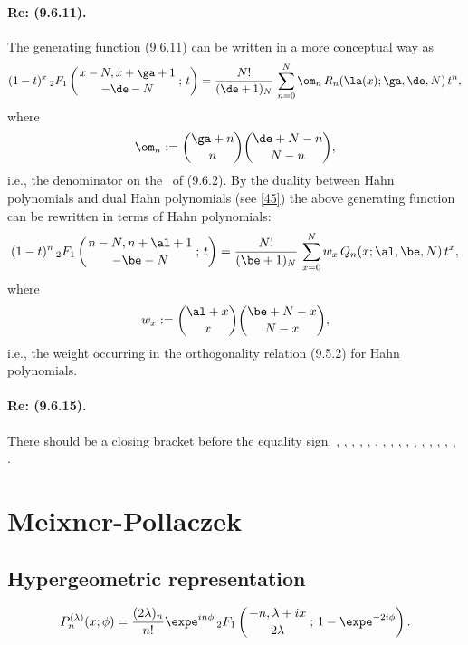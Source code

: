 \documentclass[envcountchap,graybox]{svmono}
\newcommand{\hyp}[5]{\mbox{}_{#1}{F}_{#2}
\left(\genfrac{}{}{0pt}{}{#3}{#4}\,;\,#5\right)}
\begin{document}
\paragraph{Re: (9.6.11).}
The generating function (9.6.11) can be written in a more conceptual way as
\begin{equation}
(1-t)^x\,\hyp21{x-N,x+\ga+1}{-\de-N}t=\frac{N!}{(\de+1)_N}\,
\sum_{n=0}^N \om_n\,R_n(\la(x);\ga,\de,N)\,t^n,
\label{2}
\end{equation}
where
\begin{equation}
\om_n:=\binom{\ga+n}n \binom{\de+N-n}{N-n},
\label{3}
\end{equation}
i.e., the denominator on the \RHS\ of (9.6.2).
By the duality between Hahn polynomials and dual Hahn polynomials (see \eqref{45}) the above generating function can be rewritten in
terms of Hahn polynomials:
\begin{equation}
(1-t)^n\,\hyp21{n-N,n+\al+1}{-\be-N}t=\frac{N!}{(\be+1)_N}\,
\sum_{x=0}^N w_x\,Q_n(x;\al,\be,N)\,t^x,
\label{4}
\end{equation}
where
\begin{equation}
w_x:=\binom{\al+x}x \binom{\be+N-x}{N-x},
\label{5}
\end{equation}
i.e., the weight occurring in the orthogonality relation (9.5.2)
for Hahn polynomials.
\paragraph{Re: (9.6.15).}
There should be a closing bracket before the equality sign.
%
\cite{Askey2005}, \cite{AskeyWilson85}, \cite{AtakRahmanSuslov}, \cite{AtakSuslov88},
\cite{Ismail2005II}, \cite{Karlin61}, \cite{Koorn81}, \cite{Koorn88}, \cite{Lesky93},
\cite{Lesky94I}, \cite{Lesky95I}, \cite{Lesky95II}, \cite{Nikiforov+}, \cite{NikiforovUvarov},
\cite{Rahman81II}, \cite{Stanton84}, \cite{Wilson80}.


\section{Meixner-Pollaczek}

\par\setcounter{equation}{0}

\subsection*{Hypergeometric representation}
\begin{equation}
\label{DefMP}
P_n^{(\lambda)}(x;\phi)=\frac{(2\lambda)_n}{n!}\expe^{in\phi}\,
\hyp{2}{1}{-n,\lambda+ix}{2\lambda}{1-\expe^{-2i\phi}}.
\end{equation}
\end{document}
